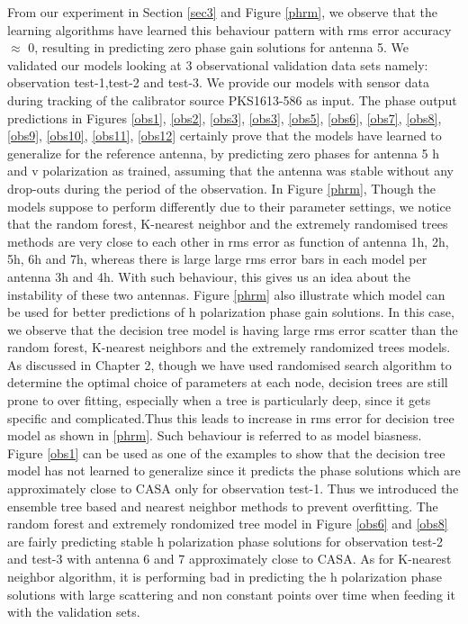 From our experiment in Section \ref{sec3} and Figure \ref{phrm}, we observe that the learning algorithms have learned this behaviour pattern with rms error accuracy $\approx$ 0, resulting in predicting zero phase gain solutions for antenna 5. We validated our models looking at 3 observational validation data sets namely: observation test-1,test-2 and test-3. We provide our models with sensor data during tracking of the calibrator source PKS1613-586 as input. The phase output predictions in Figures \ref{obs1}, \ref{obs2}, \ref{obs3}, \ref{obs3}, \ref{obs5}, \ref{obs6}, \ref{obs7}, \ref{obs8}, \ref{obs9}, \ref{obs10}, \ref{obs11}, \ref{obs12}  certainly prove that the models have learned to generalize for the reference antenna, by predicting zero phases for antenna 5 h and v polarization as trained, assuming that the antenna was stable without any drop-outs during the period of the observation. In Figure \ref{phrm}, Though the models suppose to perform differently due to their parameter settings, we notice that the random forest, K-nearest neighbor and the extremely randomised trees methods are very close to each other in rms error as function of antenna 1h, 2h, 5h, 6h and 7h, whereas there is large large rms error bars in each model per antenna 3h and 4h. With such behaviour, this gives us an idea about the instability of these two antennas. Figure \ref{phrm} also illustrate which model can be used for better predictions of h polarization phase gain solutions. In this case, we observe that the decision tree model is having large rms error scatter than the random forest, K-nearest neighbors and the extremely randomized trees models. As discussed in Chapter 2, though we have used randomised search algorithm to determine the optimal choice of parameters at each node, decision trees are still prone to over fitting, especially when a tree is particularly deep, since it gets specific and complicated.Thus this leads to increase in rms error for decision tree model as shown in \ref{phrm}. Such behaviour is referred to as model biasness. Figure \ref{obs1} can be used as one of the examples to show that the decision tree model has not learned to generalize since it predicts the phase solutions which are approximately close to CASA only for observation test-1. Thus we introduced the ensemble tree based and nearest neighbor methods to prevent overfitting. The random forest and extremely rondomized tree model in Figure \ref{obs6} and \ref{obs8} are fairly predicting stable h polarization phase solutions for observation test-2 and test-3 with antenna 6 and 7 approximately close to CASA. As for K-nearest neighbor algorithm, it is performing bad in predicting the h polarization phase solutions with large scattering and non constant points over time when feeding it with the validation sets. 
  
